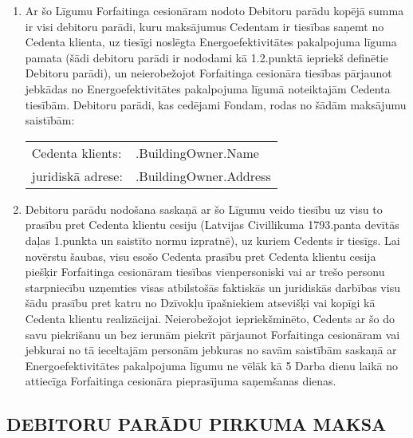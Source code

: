 \documentclass[a4paper]{article}
\begin{document}
\begin{enumerate}
\item{Ar šo Līgumu Forfaitinga cesionāram nodoto Debitoru parādu kopējā summa ir visi
debitoru parādi, kuru maksājumus Cedentam ir tiesības saņemt no Cedenta klienta, uz
tiesīgi noslēgta Energoefektivitātes pakalpojuma līguma pamata (šādi debitoru parādi ir
nododami kā 1.2.punktā iepriekš definētie Debitoru parādi), un neierobežojot Forfaitinga
cesionāra tiesības pārjaunot jebkādas no Energoefektivitātes pakalpojuma līgumā
noteiktajām Cedenta tiesībām. Debitoru parādi, kas cedējami Fondam, rodas no šādām
maksājumu saistībām: \par

    \begin{tabu}{XX[2]}
      Cedenta klients:  & {{.BuildingOwner.Name}} \\
      juridiskā adrese:      & {{.BuildingOwner.Address}}
    \end{tabu}}

\item{Debitoru parādu nodošana saskaņā ar šo Līgumu veido tiesību uz visu to prasību pret Cedenta
klientu cesiju (Latvijas Civillikuma 1793.panta devītās daļas 1.punkta un saistīto normu izpratnē),
uz kuriem Cedents ir tiesīgs. Lai novērstu šaubas, visu esošo Cedenta prasību pret Cedenta klientu
cesija piešķir Forfaitinga cesionāram tiesības vienpersoniski vai ar trešo personu starpniecību
uzņemties visas atbilstošās faktiskās un juridiskās darbības visu šādu prasību pret katru no
Dzīvokļu īpašniekiem atsevišķi vai kopīgi kā Cedenta klientu realizācijai. Neierobežojot
iepriekšminēto, Cedents ar šo do savu piekrišanu un bez ierunām piekrīt pārjaunot Forfaitinga
cesionāram vai jebkurai no tā ieceltajām personām jebkuras no savām saistībām saskaņā ar
Energoefektivitātes pakalpojuma līgumu ne vēlāk kā 5 Darba dienu laikā no attiecīga Forfaitinga
cesionāra pieprasījuma saņemšanas dienas.}
\end{enumerate}

\subsection{DEBITORU PARĀDU PIRKUMA MAKSA}
\end{document}
